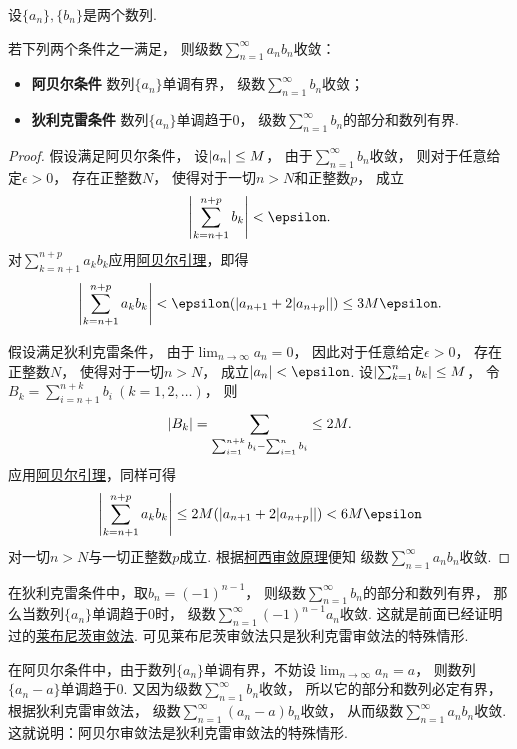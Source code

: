 \begin{theorem}\label{theorem:无穷级数.无穷级数的阿贝尔--狄利克雷审敛法}
设\(\{a_n\},\{b_n\}\)是两个数列.

若下列两个条件之一满足，
则级数\(\sum_{n=1}^\infty a_n b_n\)收敛：\begin{itemize}
	\item {\bf 阿贝尔条件}
	数列\(\{a_n\}\)单调有界，
	级数\(\sum_{n=1}^\infty b_n\)收敛；

	\item {\bf 狄利克雷条件}
	数列\(\{a_n\}\)单调趋于\(0\)，
	级数\(\sum_{n=1}^\infty b_n\)的部分和数列有界.
\end{itemize}
\begin{proof}
假设满足阿贝尔条件，
设\(\abs{a_n} \leq M\)，
由于\(\sum_{n=1}^\infty b_n\)收敛，
则对于任意给定\(\epsilon>0\)，
存在正整数\(N\)，
使得对于一切\(n>N\)和正整数\(p\)，
成立\[
	\abs{\sum_{k=n+1}^{n+p} b_k} < \epsilon.
\]
对\(\sum_{k=n+1}^{n+p} a_k b_k\)应用\hyperref[theorem:无穷级数.阿贝尔引理]{阿贝尔引理}，即得\[
	\abs{\sum_{k=n+1}^{n+p} a_k b_k}
	< \epsilon (\abs{a_{n+1} + 2 \abs{a_{n+p}}})
	\leq 3 M \epsilon.
\]

假设满足狄利克雷条件，
由于\(\lim_{n\to\infty} a_n = 0\)，
因此对于任意给定\(\epsilon>0\)，
存在正整数\(N\)，
使得对于一切\(n>N\)，
成立\(\abs{a_n} < \epsilon\).
设\(\abs{\sum_{k=1}^n b_k} \leq M\)，
令\(B_k = \sum_{i=n+1}^{n+k} b_i\ (k=1,2,\dotsc)\)，
则\[
	\abs{B_k}
	= \sum_{\sum_{i=1}^{n+k} b_i - \sum_{i=1}^n b_i}
	\leq 2 M.
\]
应用\hyperref[theorem:无穷级数.阿贝尔引理]{阿贝尔引理}，同样可得\[
	\abs{\sum_{k=n+1}^{n+p} a_k b_k}
	\leq 2 M (\abs{a_{n+1} + 2 \abs{a_{n+p}}})
	< 6 M \epsilon
\]对一切\(n>N\)与一切正整数\(p\)成立.
根据\hyperref[theorem:无穷级数.级数的柯西审敛原理]{柯西审敛原理}便知
级数\(\sum_{n=1}^\infty a_n b_n\)收敛.
\end{proof}
\end{theorem}
\begin{remark}
在狄利克雷条件中，取\(b_n = (-1)^{n-1}\)，
则级数\(\sum_{n=1}^\infty b_n\)的部分和数列有界，
那么当数列\(\{a_n\}\)单调趋于\(0\)时，
级数\(\sum_{n=1}^\infty (-1)^{n-1} a_n\)收敛.
这就是前面已经证明过的\hyperref[theorem:无穷级数.莱布尼茨定理]{莱布尼茨审敛法}.
可见莱布尼茨审敛法只是狄利克雷审敛法的特殊情形.

在阿贝尔条件中，由于数列\(\{a_n\}\)单调有界，不妨设\(\lim_{n\to\infty} a_n = a\)，
则数列\(\{a_n - a\}\)单调趋于\(0\).
又因为级数\(\sum_{n=1}^\infty b_n\)收敛，
所以它的部分和数列必定有界，根据狄利克雷审敛法，
级数\(\sum_{n=1}^\infty (a_n - a) b_n\)收敛，
从而级数\(\sum_{n=1}^\infty a_n b_n\)收敛.
这就说明：阿贝尔审敛法是狄利克雷审敛法的特殊情形.
\end{remark}

